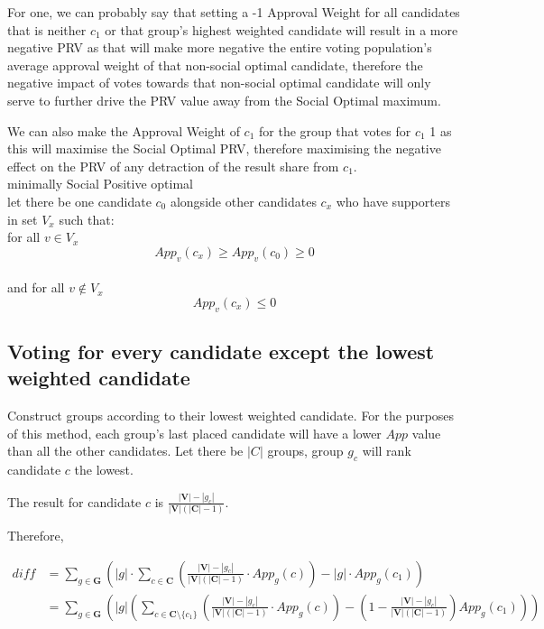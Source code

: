 \documentclass{article}
\begin{document}
For one, we can probably say that setting a -1 Approval Weight for all candidates that is neither $c_1$ or that group's highest weighted candidate will result in a more negative PRV as that will make more negative the entire voting population's average approval weight of that non-social optimal candidate, therefore the negative impact of votes towards that non-social optimal candidate will only serve to further drive the PRV value away from the Social Optimal maximum.

We can also make the Approval Weight of $c_1$ for the group that votes for $c_1$ 1 as this will maximise the Social Optimal PRV, therefore maximising the negative effect on the PRV of any detraction of the result share from $c_1$.\\

minimally Social Positive optimal\\

let there be one candidate $c_0$ alongside other candidates $c_x$ who have supporters in set $V_x$ such that:
\\for all $v \in V_x$
\begin{equation}
    App_v(c_x) \geq App_v(c_0) \geq 0
\end{equation}
\\and for all $v \notin V_x$
\begin{equation}
    App_v(c_x) \leq 0
\end{equation}
\subsection{Voting for every candidate except the lowest weighted candidate}

Construct groups according to their lowest weighted candidate. For the purposes of this method, each group's last placed candidate will have a lower $App$ value than all the other candidates. Let there be $|C|$ groups, group $g_c$ will rank candidate $c$ the lowest.

The result for candidate $c$ is $\frac{|\boldsymbol{V}|-|g_c|}{|\boldsymbol{V}|(|\boldsymbol{C}|-1)}$.

Therefore,

\begin{equation}
\begin{aligned}
diff &= \sum^{}_{g \in \boldsymbol{G}}{\left(|g| \cdot \sum^{}_{c \in \boldsymbol{C}}{\left(\frac{|\boldsymbol{V}|-|g_c|}{|\boldsymbol{V}|(|\boldsymbol{C}|-1)} \cdot App_g(c)\right)} - |g| \cdot App_g(c_1) \right)}\\
&= \sum^{}_{g \in \boldsymbol{G}}{\left(|g| \left( \sum^{}_{c \in \boldsymbol{C} \setminus \{c_1\}}{\left(\frac{|\boldsymbol{V}|-|g_c|}{|\boldsymbol{V}|(|\boldsymbol{C}|-1)} \cdot App_g(c)\right)} - \left(1 - \frac{|\boldsymbol{V}|-|g_c|}{|\boldsymbol{V}|(|\boldsymbol{C}|-1)}\right)App_g(c_1) \right) \right)}
\end{aligned}
\end{equation} 
\end{document}
